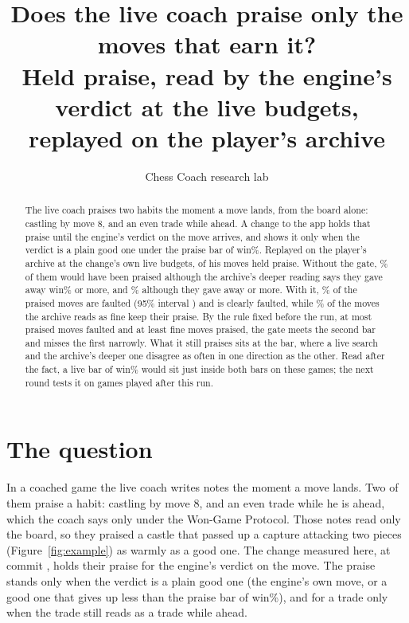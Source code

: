 \documentclass[11pt]{article}
\title{Does the live coach praise only the moves that earn it?\\[0.3em]
\large Held praise, read by the engine's verdict at the live budgets, replayed on the player's archive}
\author{Chess Coach research lab}
\date{}
\begin{document}
\maketitle

\begin{abstract}
The live coach praises two habits the moment a move lands, from the board alone: castling by
move 8, and an even trade while ahead. A change to the app holds that praise until the engine's
verdict on the move arrives, and shows it only when the verdict is a plain good one under the praise
bar of \PraiseBar{} win\%. Replayed on the player's archive at the change's own live budgets, \Moves{}
of his moves held praise. Without the gate, \FaultedAllPct\% of them would have been praised
although the archive's deeper reading says they gave away \PraiseBar{} win\% or more, and
\ClearAllPct\% although they gave away \ClearBar{} or more. With it, \FaultedPraisedPct\% of the
praised moves are faulted (95\% interval \FaultedPraisedCI) and \ClearPraised{} is clearly
faulted, while \FinePraisedPct\% of the moves the archive reads as fine keep their praise. By the
rule fixed before the run, at most \RuleFaulted{} praised moves faulted and at least \RuleFine{}
fine moves praised, the gate meets the second bar and misses the first narrowly. What it still
praises sits at the bar, where a live search and the archive's deeper one disagree as often in
one direction as the other. Read after the fact, a live bar of \CandidateBar{} win\% would sit just
inside both bars on these games; the next round tests it on games played after this run.
\end{abstract}

\section{The question}

In a coached game the live coach writes notes the moment a move lands. Two of them praise a
habit: castling by move 8, and an even trade while he is ahead, which the coach says only under
the Won-Game Protocol. Those notes read only the board, so they praised a castle that passed up a
capture attacking two pieces (Figure~\ref{fig:example}) as warmly as a good one. The change measured here, at commit \texttt{\AppCommit}, holds
their praise for the engine's verdict on the move. The praise stands only when the verdict is a
plain good one (the engine's own move, or a good one that gives up less than the praise bar of
\PraiseBar{} win\%), and for a trade only when the trade still reads as a trade while ahead.
\end{document}
